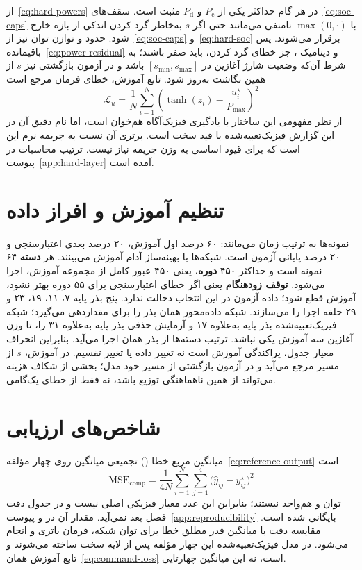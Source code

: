 از~\eqref{eq:hard-powers} در هر گام حداکثر یکی از $P_{\mathrm{c}}$ و $P_{\mathrm{d}}$ مثبت است. سقف‌های~\eqref{eq:soc-caps} با $\max(0,\cdot)$ نامنفی می‌مانند حتی اگر $s$ به‌خاطر گرد کردن اندکی از بازه خارج شود. حدود  و توازن توان نیز از~\eqref{eq:soc-caps} و~\eqref{eq:hard-soc} برقرار می‌شوند. پس باقیمانده~\eqref{eq:power-residual} و دینامیک ، جز خطای گرد کردن، باید صفر باشند؛ به شرط آن‌که وضعیت شارژ آغازین در $[s_{\min},s_{\max}]$ باشد و در آزمون بازگشتی نیز $s$ از همین نگاشت به‌روز شود. تابع آموزش، خطای فرمان مرجع است
\begin{equation}
  \mathcal{L}_{u}=\frac{1}{N}\sum_{i=1}^{N}\left(\tanh(z_{i})-\frac{u_{i}^{\star}}{P_{\max}}\right)^{2}
  \label{eq:command-loss}
\end{equation}
از نظر مفهومی این ساختار با یادگیری فیزیک‌آگاه هم‌خوان است، اما نام دقیق آن در این گزارش فیزیک‌تعبیه‌شده با قید سخت است. برتری آن نسبت به جریمه نرم این است که برای قیود اساسی به وزن جریمه نیاز نیست. ترتیب محاسبات در پیوست~\ref{app:hard-layer} آمده است.

\section{تنظیم آموزش و افراز داده}
نمونه‌ها به ترتیب زمان می‌مانند: ۶۰ درصد اول آموزش، ۲۰ درصد بعدی اعتبارسنجی و ۲۰ درصد پایانی آزمون است. شبکه‌ها با بهینه‌ساز آدام  آموزش می‌بینند. هر \textbf{دسته} ۶۴ نمونه است و حداکثر ۴۵۰ \textbf{دوره}، یعنی ۴۵۰ عبور کامل از مجموعه آموزش، اجرا می‌شود. \textbf{توقف زودهنگام} یعنی اگر خطای اعتبارسنجی برای ۵۵ دوره بهتر نشود، آموزش قطع شود؛ داده آزمون در این انتخاب دخالت ندارد. پنج بذر پایه ۷، ۱۱، ۱۹، ۲۳ و ۲۹ حلقه اجرا را می‌سازند. شبکه داده‌محور همان بذر را برای مقداردهی می‌گیرد؛ شبکه فیزیک‌تعبیه‌شده بذر پایه به‌علاوه ۱۷ و آزمایش حذفی بذر پایه به‌علاوه ۳۱ را، تا وزن آغازین سه آموزش یکی نباشد. ترتیب دسته‌ها از بذر همان اجرا می‌آید. بنابراین انحراف معیار جدول، پراکندگی آموزش است نه تغییر داده یا تغییر تقسیم. در آموزش، $s$ از مسیر مرجع می‌آید و در آزمون بازگشتی از مسیر خود مدل؛ بخشی از شکاف هزینه می‌تواند از همین ناهماهنگی توزیع باشد، نه فقط از خطای یک‌گامی.

\section{شاخص‌های ارزیابی}
میانگین مربع خطا () تجمیعی میانگین روی چهار مؤلفه~\eqref{eq:reference-output} است
\begin{equation}
  \mathrm{MSE}_{\mathrm{comp}}=\frac{1}{4N}\sum_{i=1}^{N}\sum_{j=1}^{4}\bigl(\hat{y}_{ij}-y_{ij}^{\star}\bigr)^{2}
  \label{eq:mse-comp}
\end{equation}
توان و  هم‌واحد نیستند؛ بنابراین این عدد معیار فیزیکی اصلی نیست و در جدول دقت فصل بعد نمی‌آید. مقدار آن در  و پیوست~\ref{app:reproducibility} بایگانی شده است. مقایسه دقت با میانگین قدر مطلق خطا برای توان شبکه، فرمان باتری و  انجام می‌شود. در مدل فیزیک‌تعبیه‌شده این چهار مؤلفه پس از لایه سخت ساخته می‌شوند و تابع آموزش همان~\eqref{eq:command-loss} است، نه این میانگین چهارتایی.


